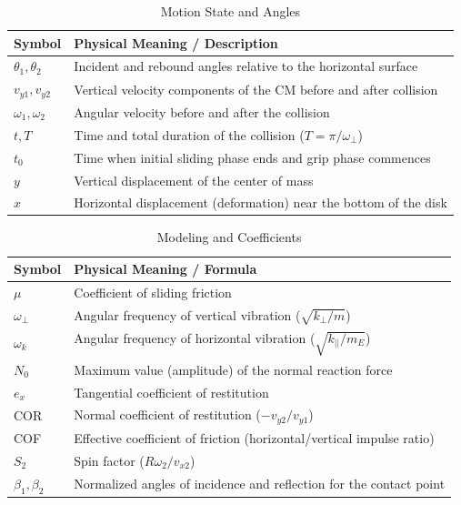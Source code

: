 \documentclass[11pt,letterpaper]{article}
\begin{document}
\begin{table}[h!]
\centering
\caption{Motion State and Angles}
\label{tab:motion_state}
\begin{tabular}{ll}
\toprule
\textbf{Symbol} & \textbf{Physical Meaning / Description} \\
\midrule
$\theta_1, \theta_2$ & Incident and rebound angles relative to the horizontal surface \\
$v_{y1}, v_{y2}$ & Vertical velocity components of the CM before and after collision \\
$\omega_1, \omega_2$ & Angular velocity before and after the collision \\
$t, T$ & Time and total duration of the collision ($T = \pi/\omega_{\perp}$) \\
$t_0$ & Time when initial sliding phase ends and grip phase commences \\
$y$ & Vertical displacement of the center of mass \\
$x$ & Horizontal displacement (deformation) near the bottom of the disk \\
\bottomrule
\end{tabular}
\end{table}

\begin{table}[h!]
\centering
\caption{Modeling and Coefficients}
\label{tab:modeling_coeffs}
\begin{tabular}{ll}
\toprule
\textbf{Symbol} & \textbf{Physical Meaning / Formula} \\
\midrule
$\mu$ & Coefficient of sliding friction \\
$\omega_{\perp}$ & Angular frequency of vertical vibration ($\sqrt{k_{\perp}/m}$) \\
$\omega_k$ & Angular frequency of horizontal vibration ($\sqrt{k_{||}/m_E}$) \\
$N_0$ & Maximum value (amplitude) of the normal reaction force \\
$e_x$ & Tangential coefficient of restitution \\
COR & Normal coefficient of restitution ($-v_{y2}/v_{y1}$) \\
COF & Effective coefficient of friction (horizontal/vertical impulse ratio) \\
$S_2$ & Spin factor ($R\omega_2/v_{x2}$) \\
$\beta_1, \beta_2$ & Normalized angles of incidence and reflection for the contact point \\
\bottomrule
\end{tabular}
\end{table}
\end{document}

